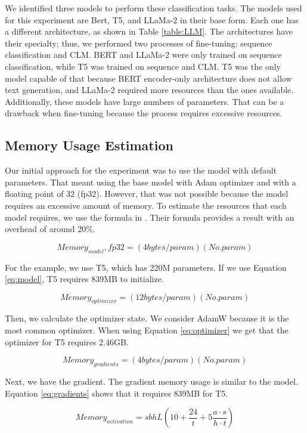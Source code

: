 We identified three models to perform these classification tasks. The models used for this experiment are Bert, T5, and LLaMa-2 in their base form. Each one has a different architecture, as shown in Table \ref{table:LLM}. The architectures have their specialty; thus, we performed two processes of fine-tuning: sequence classification and CLM. BERT and LLaMa-2 were only trained on sequence classification, while T5 was trained on sequence and CLM. T5 was the only model capable of that because BERT encoder-only architecture does not allow text generation, and LLaMa-2 required more resources than the ones available. Additionally, these models have large numbers of parameters. That can be a drawback when fine-tuning because the process requires excessive resources.


\subsection{Memory Usage Estimation}
Our initial approach for the experiment was to use the model with default parameters. That meant using the base model with Adam optimizer and with a floating point of 32 (fp32). However, that was not possible because the model requires an excessive amount of memory. To estimate the resources that each model requires, we use the formula in \cite{transformer-math-eleutherai}. Their formula provides a result with an overhead of around 20\%.


\[ Memory_{model}, fp32 = (4 bytes/param) (No. param) \label{eq:model} \tag{1} \] 

For the example, we use T5, which has 220M parameters. If we use Equation \ref{eq:model}, T5 requires 839MB to initialize.


\[ Memory_{optimizer} = (12 bytes/param) (No. param) \label{eq:optimizer} \tag{2} \] 

Then, we calculate the optimizer state. We consider AdamW because it is the most common optimizer. When using Equation \ref{eq:optimizer} we get that the optimizer for T5 requires 2.46GB.


\[ Memory_{gradients} = (4 bytes/param) (No. param) \label{eq:gradients} \tag{3} \] 

Next, we have the gradient. The gradient memory usage is similar to the model. Equation \ref{eq:gradients} shows that it requires 839MB for T5.


\[ Memory_{activation} = sbhL(10 + \frac{24}{t} + 5 \frac{a \cdot s}{h \cdot t} ) \label{eq:activation} \tag{4} \] 

